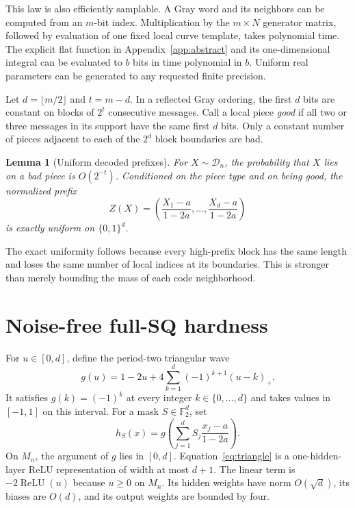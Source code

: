 \documentclass{article}
\newtheorem{lemma}[theorem]{Lemma}
\theoremstyle{definition}
\theoremstyle{remark}
\newcommand{\Ftwo}{\mathbb F_2}
\newcommand{\cD}{\mathcal D}
\newcommand{\1}{\mathbf 1}
\begin{document}
This law is also efficiently samplable. A Gray word and its neighbors can be computed from an $m$-bit index. Multiplication by the $m\times N$ generator matrix, followed by evaluation of one fixed local curve template, takes polynomial time. The explicit flat function in Appendix~\ref{app:abstract} and its one-dimensional integral can be evaluated to $b$ bits in time polynomial in $b$. Uniform real parameters can be generated to any requested finite precision.

Let $d=\lfloor m/2\rfloor$ and $t=m-d$. In a reflected Gray ordering, the first $d$ bits are constant on blocks of $2^t$ consecutive messages. Call a local piece \emph{good} if all two or three messages in its support have the same first $d$ bits. Only a constant number of pieces adjacent to each of the $2^d$ block boundaries are bad.

\begin{lemma}[Uniform decoded prefixes]
\label{lem:gray}
For $X\sim\cD_n$, the probability that $X$ lies on a bad piece is $O(2^{-t})$. Conditioned on the piece type and on being good, the normalized prefix \[ Z(X)=\left(\frac{X_1-a}{1-2a},\ldots, \frac{X_d-a}{1-2a}\right) \] is exactly uniform on $\{0,1\}^d$.
\end{lemma}

The exact uniformity follows because every high-prefix block has the same length and loses the same number of local indices at its boundaries. This is stronger than merely bounding the mass of each code neighborhood.

\section{Noise-free full-SQ hardness}
\label{sec:sq}

For $u\in[0,d]$, define the period-two triangular wave
\begin{equation}
g(u)=1-2u+4\sum_{k=1}^{d}(-1)^{k+1}(u-k)_+.
\label{eq:triangle}
\end{equation}
It satisfies $g(k)=(-1)^k$ at every integer $k\in\{0,\ldots,d\}$ and takes values in $[-1,1]$ on this interval. For a mask $S\in\Ftwo^d$, set
\begin{equation}
h_S(x)=g\left(\sum_{j=1}^d S_j\frac{x_j-a}{1-2a}\right).
\label{eq:parity-network}
\end{equation}
On $M_n$, the argument of $g$ lies in $[0,d]$. Equation~\eqref{eq:triangle} is a one-hidden-layer ReLU representation of width at most $d+1$. The linear term is $-2\operatorname{ReLU}(u)$ because $u\geq0$ on $M_n$. Its hidden weights have norm $O(\sqrt d)$, its biases are $O(d)$, and its output weights are bounded by four.
\end{document}
